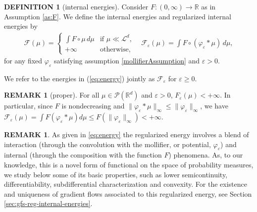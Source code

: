 \documentclass[11pt,leqno]{amsart}
\theoremstyle{definition}
\newtheorem{defi}[thm]{DEFINITION}
\newtheorem{remark}[thm]{REMARK}
\newcommand{\R}{{\mathord{\mathbb R}}}
\newcommand{\Rd}{{\mathord{\mathbb R}^d}}
\newcommand{\F}{\mathcal{F}}
\def\P{{\mathcal P}}
\def\epsilon{\varepsilon}
\def\e{\varepsilon}
\def\F{\mathcal{F}}
\begin{document}
\begin{defi}[internal energies] \label{energy def} Consider $F\colon (0,\infty)\to\R$ as in Assumption \ref{as:F}. We define the internal energies and regularized internal energies by
\begin{align}
 \label{eq:energy}
	\F(\mu) = \begin{cases} \int F\circ\mu \,d\mu & \mbox{if $\mu \ll \mathcal{L}^d$,} \\ +\infty & \mbox{otherwise,} \end{cases} \quad  \F_\e(\mu) =  \int F\circ (\varphi_\e * \mu) \, d\mu ,
\end{align}
for any fixed $\varphi_\e$ satisfying assumption \ref{mollifierAssumption} and $\epsilon >0$.
\end{defi}
We refer to the energies in (\ref{eq:energy}) jointly  as $\F_\e$ for $\e \geq 0$.

\begin{remark}[proper]
	For all $\mu \in \P(\Rd)$ and $\epsilon >0$, $F_\e(\mu) <+\infty$. In particular, since $F$ is nondecreasing and $\|\varphi_\e*\mu\|_\infty \leq \|\varphi_\e\|_\infty$, we have $\F_\e(\mu) = \int F(\varphi_\e*\mu) d\mu \leq F(\|\varphi_\e\|_\infty) < +\infty$.
\end{remark}

\begin{remark} \label{novelstructure}
	As given in \eqref{eq:energy} the regularized energy involves a blend of interaction (through the convolution with the mollifier, or potential, $\varphi_\e$) and internal (through the composition with the function $F$) phenomena. As, to our knowledge, this is a novel form of functional on the space of probability measures, we study below some of its basic properties, such as lower semicontinuity, differentiability, subdifferential characterization and convexity. For the existence and uniqueness of gradient flows associated to this regularized energy, see Section \ref{sec:gfs-reg-internal-energies}.
\end{remark}
\end{document}
